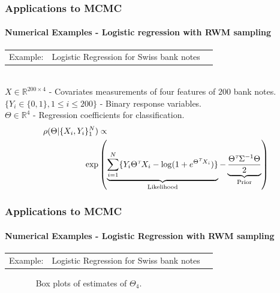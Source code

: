 \documentclass[xcolor=dvipsnames, subsection=false]{beamer}
\def\alertb#1{\alert{\color{BrickRed}  #1}}
\def\alertb#1{\alert{\color{BrickRed}  #1}}
\def\transpose{{\hbox{\it\tiny T}}}
\newcommand{\field}[1]{\mathbb{#1}}
\def\Re{\field{R}}
\newcommand{\pr}{\rho}
\begin{document}
\begin{frame}
\frametitle{Applications to MCMC}
\framesubtitle{Numerical Examples - Logistic regression with RWM sampling}
\begin{tabular}{lll}\alertb{Example:}   & Logistic Regression for Swiss bank notes
	\\
\end{tabular}\\[0.3cm]
$X \in \Re^{200 \times 4}$ - Covariates measurements of four features of $200$ bank notes. \\[0.1cm]
$\{Y_i  \in \{0,1\}, 1 \leq i \leq 200 \}$ -  Binary response variables. \\[0.1cm]
$\Theta \in \Re^4$ - Regression coefficients for classification.
\[
\begin{aligned}
\pr(\Theta| \{X_i,Y_i\}_1^N) & \propto \\ \exp & \left( \underbrace{\sum_{i=1}^N \{Y_i \Theta^\transpose X_i - \log(1+e^{\Theta^\transpose X_i} ) \}}_{\text{Likelihood}} - \underbrace{\frac{\Theta^\transpose \Sigma^{-1} \Theta}{2}}_{\text{Prior}} \right)
\end{aligned}
\]
\end{frame}

\begin{frame}
\frametitle{Applications to MCMC}
\framesubtitle{Numerical Examples - Logistic Regression with RWM sampling}
\begin{tabular}{lll}\alertb{Example:}   & Logistic Regression for Swiss bank notes
	\\
\end{tabular}
\begin{figure}
\centering
\mbox{
}
	Box plots of estimates of $\Theta_4$.
\end{figure}
\end{frame}
\end{document}
